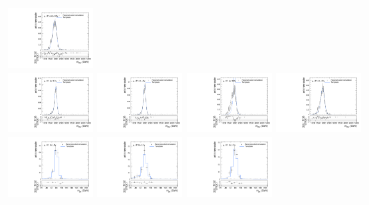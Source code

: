 \begin{figure}[htpb]
  \includegraphics[width=0.2\textwidth]{fig/2Dfit/templateVsReco_VBFGbuToWW2000_r0_MVV_mu_LP_nobb_HDy_linear.pdf}\\
  \includegraphics[width=0.2\textwidth]{fig/2Dfit/templateVsReco_VBFGbuToWW2000_r0_MVV_mu_HP_vbf_LDy_linear.pdf}
  \includegraphics[width=0.2\textwidth]{fig/2Dfit/templateVsReco_VBFGbuToWW2000_r0_MVV_mu_LP_vbf_LDy_linear.pdf}
  \includegraphics[width=0.2\textwidth]{fig/2Dfit/templateVsReco_VBFGbuToWW2000_r0_MVV_mu_HP_vbf_HDy_linear.pdf}
  \includegraphics[width=0.2\textwidth]{fig/2Dfit/templateVsReco_VBFGbuToWW2000_r0_MVV_mu_LP_vbf_HDy_linear.pdf}\\
  \includegraphics[width=0.2\textwidth]{fig/2Dfit/templateVsReco_VBFGbuToWW2000_r0_MJ_mu_HP_bb_LDy.pdf}
  \includegraphics[width=0.2\textwidth]{fig/2Dfit/templateVsReco_VBFGbuToWW2000_r0_MJ_mu_LP_bb_LDy.pdf}
  \includegraphics[width=0.2\textwidth]{fig/2Dfit/templateVsReco_VBFGbuToWW2000_r0_MJ_mu_HP_bb_HDy.pdf}

\end{figure}
